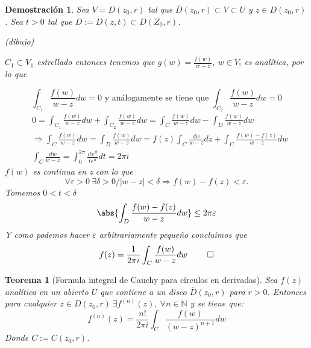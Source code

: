 \documentclass[12pt]{book}
\newtheorem{theorem}{Teorema}[chapter]
\newtheorem*{dem}{Demostración}
\newcommand{\N}{\mathbb{N}}
\begin{document}
\begin{dem}
Sea $V = D(z_0,r)$ tal que $\bar{D}(z_0,r)\subset V\subset U$ y $z\in D(z_0,r)$. Sea $t>0$ tal que $D:= D(z,t)\subset D(Z_0,r)$.

(dibujo)

$C_1 \subset V_1$ estrellado entonces tenemos que $g(w) = \frac{f(w)}{w-z},\ w\in V_!$ es analítica, por lo que

$$\int_{C_1} \frac{f(w)}{w-z} dw = 0 \text{ y análogamente se tiene que } \int_{C_2} \frac{f(w)}{w-z} dw = 0$$
\begin{align*}
&0 = \int_{C_1} \frac{f(w)}{w-z} dw + \int_{C_2} \frac{f(w)}{w-z} dw = \int_{C} \frac{f(w)}{w-z} dw - \int_{D} \frac{f(w)}{w-z} dw\\
&\Rightarrow \int_{C} \frac{f(w)}{w-z} dw = \int_{D} \frac{f(w)}{w-z} dw = f(z) \int_C\frac{dw}{w-z}dz + \int_C\frac{f(w)-f(z)}{w-z}dw\\
&\int_{C} \frac{dw}{w-z} = \int_0^{2\pi} \frac{ite^{it}}{te^{it}}dt = 2\pi i
\end{align*}
$f(w)$ es continua en z con lo que $$\forall \varepsilon>0 \ \exists \delta>0 / |w-z|<\delta \Rightarrow f(w)-f(z)<\varepsilon .$$ Tomemos $0<t<\delta$
$$\abs{\int_D\frac{f(w)-f(z)}{w-z}dw} \leq  2\pi \varepsilon$$
Y como podemos hacer $\varepsilon$ arbitrariamente pequeño concluimos que 
$$
f(z) = \frac{1}{2\pi i}\int_C \frac{f(w)}{w-z}dw\ \qed
$$
\end{dem}


\begin{theorem}[Formula integral de Cauchy para círculos en derivadas]
Sea $f(z)$ analítica en un abierto $U$ que contiene a un disco $\overline{D}(z_0,r)$ para $r>0$. Entonces para cualquier $z \in D(z_0,r)\ \exists f^{(n)}(z),\ \forall n\in \N$ y se tiene que:
$$
f^{(n)}(z) = \frac{n!}{2\pi i}\int_C \frac{f(w)}{(w-z)^{n+1}}dw
$$
Donde $C:= C(z_0,r)$.
\end{theorem}
\end{document}
